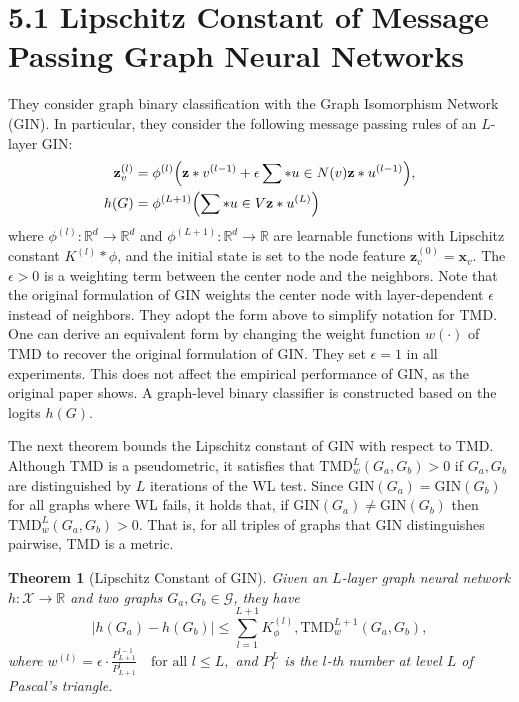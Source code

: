 \documentclass[11pt]{article}\usepackage{amsmath,amssymb,amsthm,bbm}
\newtheorem{theorem}{Theorem}
\newcommand{\1}{\mathbbm{1}}
\begin{document}
\section*{5.1 Lipschitz Constant of Message Passing Graph Neural Networks}
They consider graph binary classification with the Graph Isomorphism Network (GIN). In particular, they consider the following
message passing rules of an $L$-layer GIN:
\begin{align}
\mathbf{z}_v^{(l)} &= \phi^{(l)}\Bigl(\mathbf{z}*v^{(l-1)} + \epsilon \sum*{u\in N(v)} \mathbf{z}*u^{(l-1)}\Bigr), \\
h(G) &= \phi^{(L+1)}\Bigl(\sum*{u\in V} \mathbf{z}*u^{(L)}\Bigr)
\end{align}
where $\phi^{(l)}: \mathbb{R}^d\to\mathbb{R}^d$ and $\phi^{(L+1)}: \mathbb{R}^d\to\mathbb{R}$ are learnable functions with Lipschitz constant $K^{(l)}*{\phi}$, and the initial state is set to the node feature $\mathbf{z}_v^{(0)} = \mathbf{x}_v$. The $\epsilon>0$ is a weighting term between the center node and the neighbors. Note that the original formulation of GIN  weights the center node with layer-dependent $\epsilon$ instead of neighbors. They adopt the form above to simplify notation for TMD. One can derive an equivalent form by changing the weight function $w(\cdot)$ of TMD to recover the original formulation of GIN. They set $\epsilon = 1$ in all experiments. This does not affect the empirical performance of GIN, as the original paper shows. A graph-level binary classifier is constructed based on the logits $h(G)$.

The next theorem bounds the Lipschitz constant of GIN with respect to TMD. Although TMD is a pseudometric, it satisfies that $\mathrm{TMD}_w^{L}(G_a,G_b)>0$ if $G_a,G_b$ are distinguished by $L$ iterations of the WL test. Since $\mathrm{GIN}(G_a)=\mathrm{GIN}(G_b)$ for all graphs where WL fails, it holds that, if $\mathrm{GIN}(G_a)\neq\mathrm{GIN}(G_b)$ then $\mathrm{TMD}_w^{L}(G_a,G_b)>0$. That is, for all triples of graphs that GIN distinguishes pairwise, TMD is a metric.

\begin{theorem}[Lipschitz Constant of GIN]
Given an $L$-layer graph neural network $h: \mathcal{X}\to\mathbb{R}$ and two graphs $G_a,G_b\in\mathcal{G}$, they have
\begin{equation}
|h(G_a)-h(G_b)| \le \sum_{l=1}^{L+1} K^{(l)}_{\phi},\mathrm{TMD}_w^{L+1}(G_a,G_b),
\end{equation}
where
$ w^{(l)} = \epsilon\cdot\frac{P^{l-1}_{L+1}}{P^l_{L+1}} \quad\text{for all }l\le L,$
and $P^L_l$ is the $l$-th number at level $L$ of Pascal’s triangle.
\end{theorem}
\end{document}
